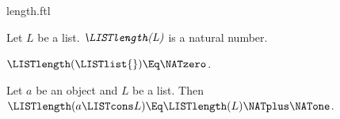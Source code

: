 \documentclass{stex}
\begin{document}
\begin{smodule}{length.ftl}

\begin{signature}[forthel]
  Let $L$ be a list.
  $\emph{\LISTlength(L)}$ is a natural number.
\end{signature}

\begin{axiom}[forthel]
  $\LISTlength(\LISTlist{}) \Eq \NATzero$.
\end{axiom}

\begin{axiom}[forthel]
  Let $a$ be an object and $L$ be a list.
  Then $\LISTlength(a \LISTcons L) \Eq \LISTlength(L) \NATplus \NATone$.
\end{axiom}
\end{smodule}
\end{document}
